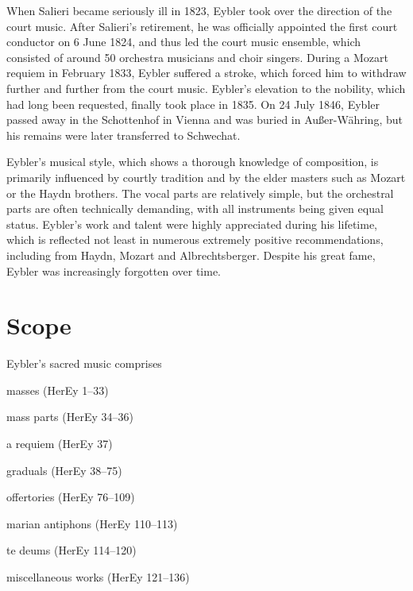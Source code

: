 \documentclass{ees}
\begin{document}
When Salieri became seriously ill in 1823, Eybler took over the direction of the court music. After Salieri's retirement, he was officially appointed the first court conductor on 6 June 1824, and thus led the court music ensemble, which consisted of around 50 orchestra musicians and choir singers. During a Mozart requiem in February 1833, Eybler suffered a stroke, which forced him to withdraw further and further from the court music. Eybler's elevation to the nobility, which had long been requested, finally took place in 1835. On 24 July 1846, Eybler passed away in the Schottenhof in Vienna and was buried in Außer-Währing, but his remains were later transferred to Schwechat.

Eybler's musical style, which shows a thorough knowledge of composition, is primarily influenced by courtly tradition and by the elder masters such as Mozart or the Haydn brothers. The vocal parts are relatively simple, but the orchestral parts are often technically demanding, with all instruments being given equal status. Eybler's work and talent were highly appreciated during his lifetime, which is reflected not least in numerous extremely positive recommendations, including from Haydn, Mozart and Albrechtsberger. Despite his great fame, Eybler was increasingly forgotten over time.


\section{Scope}

Eybler's sacred music comprises
\begin{bulletlist}
  \item masses (HerEy 1–33)
  \item mass parts (HerEy 34–36)
  \item a requiem (HerEy 37)
  \item graduals (HerEy 38–75)
  \item offertories (HerEy 76–109)
  \item marian antiphons (HerEy 110–113)
  \item te deums (HerEy 114–120)
  \item miscellaneous works (HerEy 121–136)
\end{bulletlist}
\end{document}
